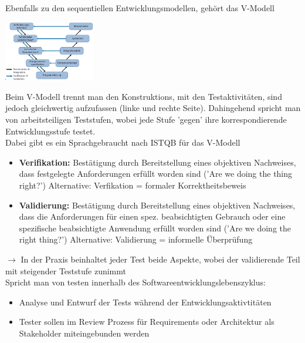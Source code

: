 \documentclass{report}
\newenvironment{Figure}
	{\par\medskip\noindent\minipage{\linewidth}}
	{\endminipage\par\medskip}
\theoremstyle{definition}
\theoremstyle{example}
\begin{document}
Ebenfalls zu den sequentiellen Entwicklungsmodellen, gehört das V-Modell

\begin{Figure}
   \centering
    \includegraphics[width=150px]{img/VModell.png}
        \label{fig:V-Modell}
\end{Figure}

Beim V-Modell trennt man den Konstruktions, mit den Testaktivitäten, sind jedoch gleichwertig aufzufassen (linke und rechte Seite). Dahingehend spricht man von arbeitsteiligen Teststufen, wobei jede Stufe 'gegen' ihre korrespondierende Entwicklungsstufe testet.\\

Dabei gibt es ein Sprachgebraucht nach ISTQB für das V-Modell
\begin{itemize}
   \item \textbf{Verifikation:} Bestätigung durch Bereitstellung eines objektiven Nachweises, dass festgelegte Anforderungen erfüllt worden sind ('Are we doing the thing right?')
   \subitem Alternative: Verfikation = formaler Korrektheitsbeweis 
   \item \textbf{Validierung:} Bestätigung durch Bereitstellung eines objektiven Nachweises, dass die Anforderungen für einen spez. beabsichtigten Gebrauch oder eine spezifische beabsichtigte Anwendung erfüllt worden sind ('Are we doing the right thing?')
   \subitem Alternative: Validierung = informelle Überprüfung 
\end{itemize}
$\rightarrow$ In der Praxis beinhaltet jeder Test beide Aspekte, wobei der validierende Teil mit steigender Teststufe zunimmt\\

Spricht man von testen innerhalb des Softwareentwicklungslebenszyklus:
\begin{itemize}
   \item Analyse und Entwurf der Tests während der Entwicklungsaktivtitäten
   \item Tester sollen im Review Prozess für Requirements oder Architektur als Stakeholder miteingebunden werden
\end{itemize}
\end{document}
